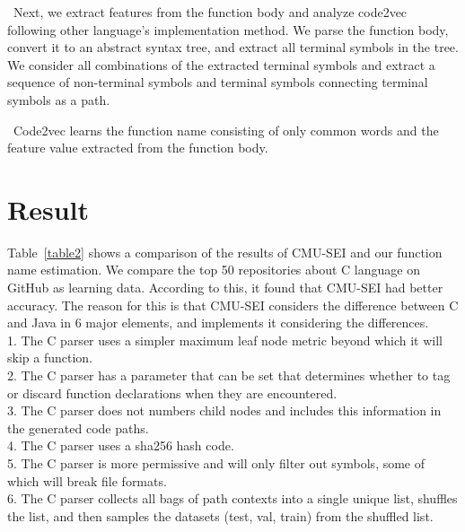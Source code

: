 \documentclass[JIP]{apris}
\begin{document}
 Next, we extract features from the function body and analyze code2vec following other language's implementation method.
We parse the function body, convert it to an abstract syntax tree, and extract all terminal symbols in the tree.
We consider all combinations of the extracted terminal symbols and extract a sequence of non-terminal symbols and terminal symbols connecting terminal symbols as a path.

 Code2vec learns the function name consisting of only common words and the feature value extracted from the function body.


\section{Result}
Table~\ref{table2} shows a comparison of the results of CMU-SEI and our function name estimation.  
We compare the top 50 repositories about C language on GitHub as learning data. According to this, it found that CMU-SEI had better accuracy. 
The reason for this is that CMU-SEI considers the difference between C and Java in 6 major elements, and implements it considering the differences.\\
1. The C parser uses a simpler maximum leaf node metric beyond which it will skip a function.\\
2. The C parser has a parameter that can be set that determines whether to tag or discard function declarations when they are encountered.\\
3. The C parser does not numbers child nodes and includes this information in the generated code paths.\\
4. The C parser uses a sha256 hash code.\\
5. The C parser is more permissive and will only filter out symbols, some of which will break file formats.\\
6. The C parser collects all bags of path contexts into a single unique list, shuffles the list, and then samples the datasets (test, val, train) from the shuffled list.
\end{document}
